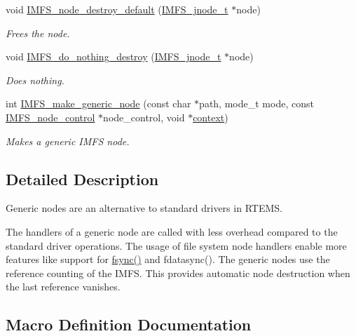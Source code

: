 \begin{DoxyCompactItemize}
\item 
void \mbox{\hyperlink{group__IMFSGenericNodes_gaec999106a1cb28b45a46896fce71f320}{I\+M\+F\+S\+\_\+node\+\_\+destroy\+\_\+default}} (\mbox{\hyperlink{structIMFS__jnode__tt}{I\+M\+F\+S\+\_\+jnode\+\_\+t}} $\ast$node)
\begin{DoxyCompactList}\small\item\em Frees the node. \end{DoxyCompactList}\item 
void \mbox{\hyperlink{group__IMFSGenericNodes_ga1b73262616b2acec68486a12229f1553}{I\+M\+F\+S\+\_\+do\+\_\+nothing\+\_\+destroy}} (\mbox{\hyperlink{structIMFS__jnode__tt}{I\+M\+F\+S\+\_\+jnode\+\_\+t}} $\ast$node)
\begin{DoxyCompactList}\small\item\em Does nothing. \end{DoxyCompactList}\item 
int \mbox{\hyperlink{group__IMFSGenericNodes_gae7bc195be301f29ac87799edab608076}{I\+M\+F\+S\+\_\+make\+\_\+generic\+\_\+node}} (const char $\ast$path, mode\+\_\+t mode, const \mbox{\hyperlink{structIMFS__node__control}{I\+M\+F\+S\+\_\+node\+\_\+control}} $\ast$node\+\_\+control, void $\ast$\mbox{\hyperlink{sun4u_2tte_8h_a9b4a99475e2709333b8e5d70483173f1}{context}})
\begin{DoxyCompactList}\small\item\em Makes a generic I\+M\+FS node. \end{DoxyCompactList}\end{DoxyCompactItemize}


\subsection{Detailed Description}
Generic nodes are an alternative to standard drivers in R\+T\+E\+MS. 

The handlers of a generic node are called with less overhead compared to the standard driver operations. The usage of file system node handlers enable more features like support for \mbox{\hyperlink{fsync_8c_a9ba34c4ff72e21db486eedf77c2a18d0}{fsync()}} and fdatasync(). The generic nodes use the reference counting of the I\+M\+FS. This provides automatic node destruction when the last reference vanishes. 

\subsection{Macro Definition Documentation}
\mbox{\label{group__IMFSGenericNodes_ga8764e226d4483098ea7e5dee061927f3}} 
